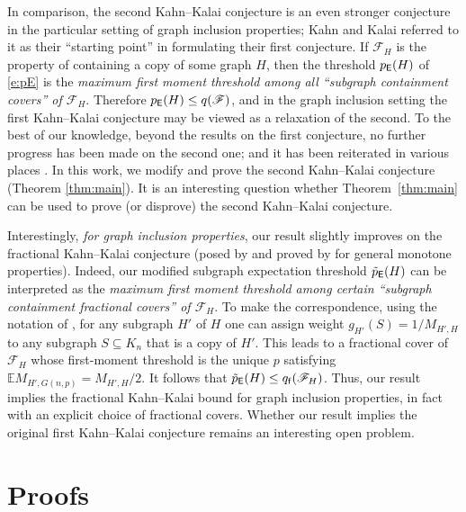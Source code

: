 \documentclass[11pt,reqno]{amsart}
\theoremstyle{plain}
\theoremstyle{definition}
\theoremstyle{remark}
\newcommand{\E}{\mathbb{E}}
\begin{document}
 In comparison, the second Kahn--Kalai conjecture is an even stronger conjecture in the particular setting of graph inclusion properties; Kahn and Kalai referred to it as their ``starting point'' in formulating their first conjecture. If $\mathscr{F}_H$ is the property of containing a copy of some graph $H$, then the threshold $p_\mathsf{E}(H)$ of \eqref{e:pE} is the \emph{maximum first moment threshold among all ``subgraph containment covers'' of $\mathscr{F}_H$}. Therefore $p_\mathsf{E}(H) \le q(\mathscr{F})$, and in the graph inclusion setting the first Kahn--Kalai conjecture may be viewed as a relaxation of the second. To the best of our knowledge, beyond the results on the first conjecture, no further progress has been made on the second one; and it has been reiterated in various places \cite{filmus2014real,fracKK_annals}. In this work, we modify and prove the second Kahn--Kalai conjecture (Theorem \ref{thm:main}). It is an interesting question whether Theorem~\ref{thm:main} can be used to prove (or disprove) the second Kahn--Kalai conjecture.

Interestingly, \emph{for graph inclusion properties}, our result slightly improves on the fractional Kahn--Kalai conjecture (posed by \cite{MR2743011} and proved by \cite{fracKK_annals} for general monotone properties). Indeed, our modified subgraph expectation threshold $\tilde{p}_\mathsf{E}(H)$ can be interpreted as the 
\emph{maximum first moment threshold among certain
``subgraph containment fractional covers'' of $\mathscr{F}_H$}. To make the correspondence, using the notation of \cite{fracKK_annals}, for any subgraph $H'$ of $H$ one can assign weight $g_{H'}(S)=1/M_{H',H}$ to any subgraph $S\subseteq K_n$ that is a copy of $H'$. This leads to a fractional cover of $\mathscr{F}_H$ whose first-moment threshold is the unique $p$ satisfying $\E M_{H',G(n,p)} = M_{H',H}/2$.  It follows that $\tilde{p}_\mathsf{E}(H) \le q_\mathsf{f}(\mathscr{F}_H)$. Thus, our result implies the fractional Kahn--Kalai bound for graph inclusion properties, in fact with an explicit choice of fractional covers. Whether our result implies the original first Kahn--Kalai conjecture remains an interesting open problem.

\section{Proofs}
\end{document}
